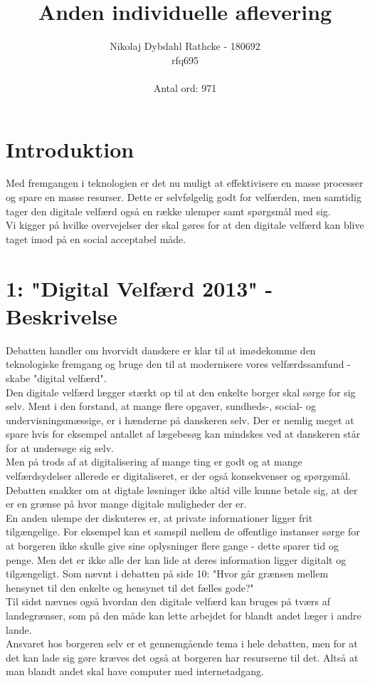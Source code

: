 \documentclass[12pt]{article}
\title{Anden individuelle aflevering}
\author{Nikolaj Dybdahl Rathcke - 180692 \\ rfq695 \\\\ Antal ord: 971}
\begin{document}
\maketitle

\section*{Introduktion}
Med fremgangen i teknologien er det nu muligt at effektivisere en masse processer og spare en masse resurser. Dette er selvfølgelig godt for velfærden, men samtidig tager den digitale velfærd også en række ulemper samt spørgsmål med sig.\\
Vi kigger på hvilke overvejelser der skal gøres for at den digitale velfærd kan blive taget imod på en social acceptabel måde.

\section*{1: "Digital Velfærd 2013" - Beskrivelse}
Debatten handler om hvorvidt danskere er klar til at imødekomme den teknologiske fremgang og bruge den til at modernisere vores velfærdssamfund - skabe "digital velfærd". \\
Den digitale velfærd lægger stærkt op til at den enkelte borger skal sørge for sig selv. Ment i den forstand, at mange flere opgaver, sundheds-, social- og undervisningsmæssige, er i hænderne på danskeren selv. Der er nemlig meget at spare hvis for eksempel antallet af lægebesøg kan mindskes ved at danskeren står for at undersøge sig selv.\\
Men på trods af at digitalisering af mange ting er godt og at mange velfærdsydelser allerede er digitaliseret, er der også konsekvenser og spørgsmål. Debatten snakker om at digtale løsninger ikke altid ville kunne betale sig, at der er en grænse på hvor mange digitale muligheder der er.\\
En anden ulempe der diskuteres er, at private informationer ligger frit tilgængelige. For eksempel kan et samspil mellem de offentlige instanser sørge for at borgeren ikke skulle give sine oplysninger flere gange - dette sparer tid og penge. Men det er ikke alle der kan lide at deres information ligger digitalt og tilgængeligt. Som nævnt i debatten på side 10: "Hvor går grænsen mellem hensynet til den enkelte og hensynet til det fælles gode?"\\
Til sidst nævnes også hvordan den digitale velfærd kan bruges på tværs af landegrænser, som på den måde kan lette arbejdet for blandt andet læger i andre lande. \\
Ansvaret hos borgeren selv er et gennemgående tema i hele debatten, men for at det kan lade sig gøre kræves det også at borgeren har resurserne til det. Altså at man blandt andet skal have computer med internetadgang.
\end{document}
